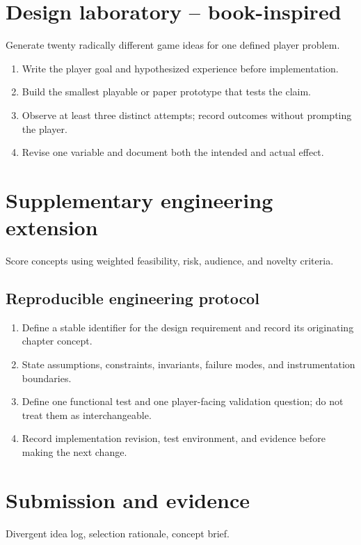 \documentclass[11pt]{article}
\begin{document}
\section{Design laboratory -- book-inspired}
Generate twenty radically different game ideas for one defined player problem.

\begin{enumerate}
\item Write the player goal and hypothesized experience before implementation.
\item Build the smallest playable or paper prototype that tests the claim.
\item Observe at least three distinct attempts; record outcomes without prompting the player.
\item Revise one variable and document both the intended and actual effect.
\end{enumerate}

\section{Supplementary engineering extension}
Score concepts using weighted feasibility, risk, audience, and novelty criteria.


\subsection{Reproducible engineering protocol}
\begin{enumerate}
\item Define a stable identifier for the design requirement and record its originating chapter concept.
\item State assumptions, constraints, invariants, failure modes, and instrumentation boundaries.
\item Define one functional test and one player-facing validation question; do not treat them as interchangeable.
\item Record implementation revision, test environment, and evidence before making the next change.
\end{enumerate}

\section{Submission and evidence}
Divergent idea log, selection rationale, concept brief.
\end{document}
